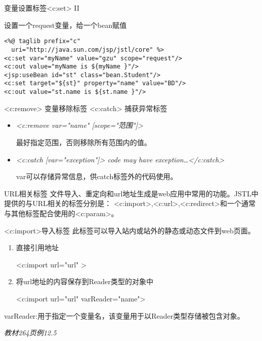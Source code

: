 \documentclass{beamer}
\begin{document}
\begin{frame}[fragile]{变量设置标签<c:set> II}
\begin{block}{设置一个request变量，给一个bean赋值}
\begin{lstlisting}
<%@ taglib prefix="c" 
  uri="http://java.sun.com/jsp/jstl/core" %>
<c:set var="myName" value="gzu" scope="request"/>
<c:out value="myName is ${myName }"/>
<jsp:useBean id="st" class="bean.Student"/>
<c:set target="${st}" property="name" value="BD"/>
<c:out value="st.name is ${st.name }"/>
\end{lstlisting}
\end{block}
\end{frame}
\begin{frame}[fragile]{<c:remove> 变量移除标签 <c:catch> 捕获异常标签}
\begin{itemize}
\item
\emph{<c:remove var="name" [scope="范围"]>}

最好指定范围，否则移除所有范围内的值。
\item
\emph{<c:catch [var="exception"]> code may have exception\ldots </c:catch>}

var可以存储异常信息，供catch标签外的代码使用。
\end{itemize}
\end{frame}
\begin{frame}{URL相关标签}
文件导入、重定向和url地址生成是web应用中常用的功能。JSTL中提供的与URL相关的标签分别是：
<c:import>,<c:url>,<c:redirect>和一个通常与其他标签配合使用的<c:param>。
\end{frame}
\begin{frame}{<c:import>导入标签}
此标签可以导入站内或站外的静态或动态文件到web页面。
\begin{enumerate}
\item
直接引用地址

<c:import url="url" >
\item
将url地址的内容保存到Reader类型的对象中

<c:import url="url" varReader="name">
\end{enumerate}
varReader:用于指定一个变量名，该变量用于以Reader类型存储被包含对象。

\emph{教材264页例12.5}
\end{frame}
\end{document}
